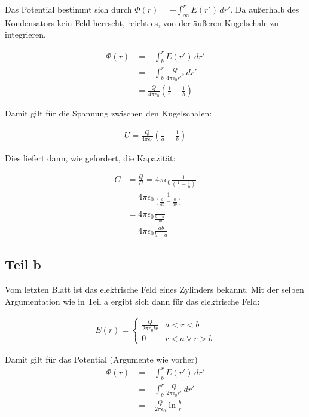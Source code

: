 \documentclass[a4paper,german,12pt,smallheadings]{scrartcl}
\begin{document}
Das Potential bestimmt sich durch $\Phi(r) = -\int_\infty^r E(r')\, dr'$. Da
außerhalb des Kondensators kein Feld herrscht, reicht es, von der äußeren
Kugelschale zu integrieren.

\begin{align*}
  \Phi(r) &= -\int_{b}^r E(r')\, dr' \\
          &= -\int_{b}^r \frac{Q}{4 \pi \epsilon_0 r'^2}\, dr' \\
          &= \frac{Q}{4\pi \epsilon_0} \left(\frac{1}{r}-\frac{1}{b}\right)
\end{align*}

Damit gilt für die Spannung zwischen den Kugelschalen:

\begin{align*}
  U = \frac{Q}{4\pi \epsilon_0} \left(\frac{1}{a}-\frac{1}{b}\right)
\end{align*}

Dies liefert dann, wie gefordert, die Kapazität:

\begin{align*}
  C &= \frac{Q}{U} =  4\pi \epsilon_0 \frac{1}{\left(\frac{1}{a}-\frac{1}{b}\right)} \\
    &=  4\pi \epsilon_0 \frac{1}{\left(\frac{b}{ab}-\frac{a}{ab}\right)} \\
    &=  4\pi \epsilon_0 \frac{1}{\frac{b-a}{ab}} \\
    &=  4\pi \epsilon_0 \frac{ab}{b-a}
\end{align*}

\subsection*{Teil b}
Vom letzten Blatt ist das elektrische Feld eines Zylinders bekannt. Mit der
selben Argumentation wie in Teil a ergibt sich dann für das elektrische Feld:

\begin{align*}
  E(r) = \left\{\begin{array}{ll} \frac{Q}{2 \pi \epsilon_0 lr} & a < r < b \\
         0 & r < a \lor r > b\end{array}\right.
\end{align*}

Damit gilt für das Potential (Argumente wie vorher)
\begin{align*}
  \Phi(r) &= -\int_{b}^r E(r')\, dr' \\
          &= -\int_{b}^r \frac{Q}{2 \pi \epsilon_0 r'}\, dr' \\
          &= -\frac{Q}{2 \pi \epsilon_0} \ln \frac{b}{r}
\end{align*}
\end{document}
